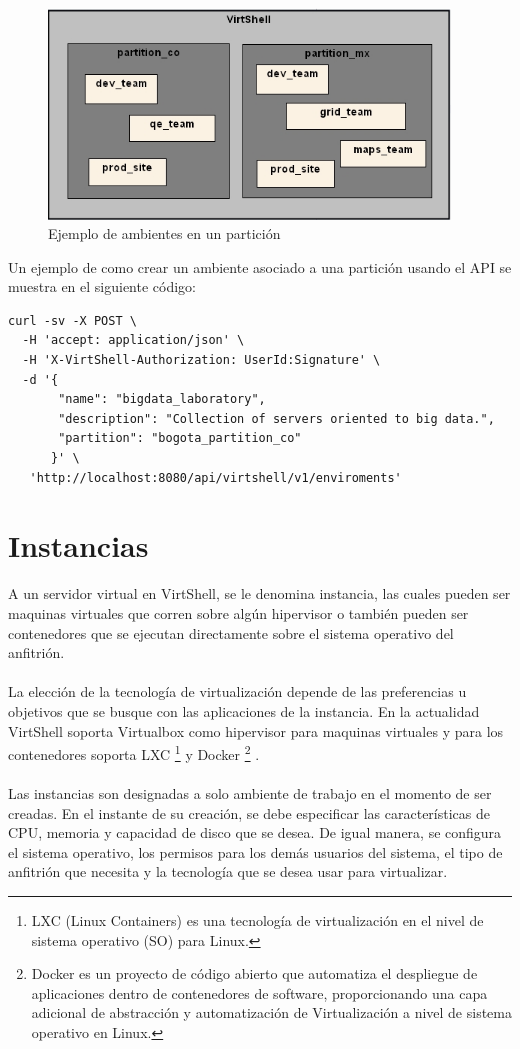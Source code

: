 \begin{figure}[h]
    \centering
  \caption{Ejemplo de ambientes en un partición}
  \label{fig:enviroment}
  \includegraphics[width = 0.95\textwidth]{../architecture/v1/diagrams/enviroments}
\end{figure}

Un ejemplo de como crear un ambiente asociado a una partición usando el API se muestra en el siguiente código:

\begin{lstlisting}[style=json, caption=Petición HTTP para crear un ambiente]
curl -sv -X POST \
  -H 'accept: application/json' \
  -H 'X-VirtShell-Authorization: UserId:Signature' \
  -d '{
       "name": "bigdata_laboratory",
       "description": "Collection of servers oriented to big data.", 
       "partition": "bogota_partition_co"
      }' \
   'http://localhost:8080/api/virtshell/v1/enviroments'
\end{lstlisting}

\section{Instancias}
A un servidor virtual en VirtShell, se le denomina instancia, las cuales pueden ser maquinas virtuales que corren sobre algún hipervisor o también pueden ser contenedores que se ejecutan directamente sobre el sistema operativo del anfitrión. \\
\\
La elección de la tecnología de virtualización depende de las preferencias u objetivos que se busque con las aplicaciones de la instancia. En la actualidad VirtShell soporta Virtualbox como hipervisor para maquinas virtuales y para los contenedores soporta LXC \footnote{LXC (Linux Containers) es una tecnología de virtualización en el nivel de sistema operativo (SO) para Linux. } \cite{lxc16} y Docker \footnote{Docker es un proyecto de código abierto que automatiza el despliegue de aplicaciones dentro de contenedores de software, proporcionando una capa adicional de abstracción y automatización de Virtualización a nivel de sistema operativo en Linux.} \cite{docker16}.\\
\\
Las instancias son designadas a solo ambiente de trabajo en el momento de ser creadas. En el instante de su creación, se debe especificar las características de CPU, memoria y capacidad de disco que se desea. De igual manera, se configura el sistema operativo, los permisos para los demás usuarios del sistema, el tipo de anfitrión que necesita y la tecnología que se desea usar para virtualizar.

